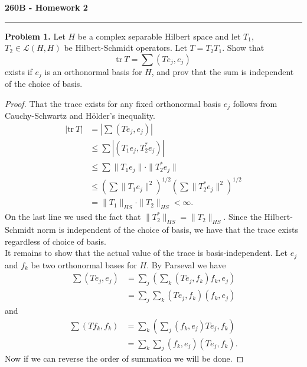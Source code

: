 \documentclass[11pt,letterpaper]{report}
\newcommand{\mcal}[1]{\mathcal{#1}}
\newcommand{\tr}{\text{tr}}
\begin{document}
\begin{center}
{\bf \Large 260B - Homework 2} %
\vspace{0.2cm}
\hrule
\end{center}

\noindent\textbf{Problem 1. }Let $H$ be a complex separable Hilbert space and let $T_1$, $T_2\in \mcal{L}(H, H)$ be Hilbert-Schmidt operators. Let $T = T_2T_1$. Show that
\[
\tr\ T = \sum(Te_j, e_j)
\]
exists if $e_j$ is an orthonormal basis for $H$, and prov that the sum is independent of the choice of basis.
\begin{proof}
	That the trace exists for any fixed orthonormal basis $e_j$ follows from Cauchy-Schwartz and H\"older's inequality.
	\begin{align*}
		|\tr\ T| &= \left|\sum (Te_j, e_j)\right|\\
		&\leq \sum |(T_1e_j, T_2^*e_j)|\\
		&\leq \sum \|T_1e_j\|\cdot \|T_2^*e_j\|\\
		&\leq \left(\sum \|T_1e_j\|^2\right)^{1/2}\left(\sum \|T_2^*e_j\|^2\right)^{1/2}\\
		&= \|T_1\|_{HS}\cdot \|T_2\|_{HS}<\infty.
	\end{align*}
	On the last line we used the fact that $\|T_2^*\|_{HS} = \|T_2\|_{HS}$. Since the Hilbert-Schmidt norm is independent of the choice of basis, we have that the trace exists regardless of choice of basis.\\

	\noindent It remains to show that the actual value of the trace is basis-independent. Let $e_j$ and $f_k$ be two orthonormal bases for $H$. By Parseval we have
	\begin{align*}
		\sum (Te_j, e_j) &= \sum_j\left(\sum_k(Te_j, f_k)f_k, e_j\right)\\
		&= \sum_j\sum_k(Te_j, f_k)(f_k, e_j)
	\end{align*}
	and
	\begin{align*}
		\sum (Tf_k, f_k) &= \sum_k\left(\sum_j(f_k, e_j)Te_j, f_k\right)\\
		&= \sum_k\sum_j(f_k, e_j)(Te_j, f_k).
	\end{align*}
	Now if we can reverse the order of summation we will be done. 
\end{proof}
\end{document}
